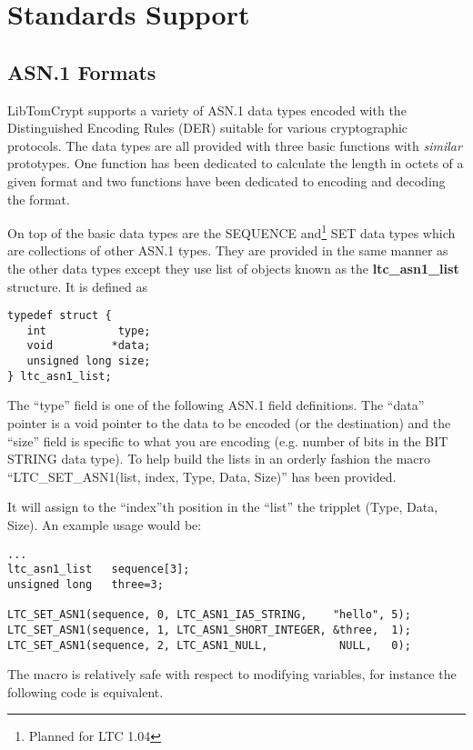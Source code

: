\documentclass[a4paper]{book}
\begin{document}
\chapter{Standards Support}
\section{ASN.1 Formats}
LibTomCrypt supports a variety of ASN.1 data types encoded with the Distinguished Encoding Rules (DER) suitable for various cryptographic protocols.  The data types
are all provided with three basic functions with \textit{similar} prototypes.  One function has been dedicated to calculate the length in octets of a given
format and two functions have been dedicated to encoding and decoding the format.  

On top of the basic data types are the SEQUENCE and\footnote{Planned for LTC 1.04} SET data types which are collections of other ASN.1 types.  They are provided 
in the same manner as the other data types except they use list of objects known as the \textbf{ltc\_asn1\_list} structure.  It is defined as 

\begin{verbatim}
typedef struct {
   int           type;
   void         *data;
   unsigned long size;
} ltc_asn1_list;
\end{verbatim}

The ``type'' field is one of the following ASN.1 field definitions.  The ``data'' pointer is a void pointer to the data to be encoded (or the destination) and the 
``size'' field is specific to what you are encoding (e.g. number of bits in the BIT STRING data type).  To help build the lists in an orderly fashion the macro
``LTC\_SET\_ASN1(list, index, Type, Data, Size)'' has been provided.

It will assign to the ``index''th position in the ``list'' the tripplet (Type, Data, Size).  An example usage would be:

\begin{small}
\begin{verbatim}
...
ltc_asn1_list   sequence[3];
unsigned long   three=3;

LTC_SET_ASN1(sequence, 0, LTC_ASN1_IA5_STRING,    "hello", 5);
LTC_SET_ASN1(sequence, 1, LTC_ASN1_SHORT_INTEGER, &three,  1);
LTC_SET_ASN1(sequence, 2, LTC_ASN1_NULL,           NULL,   0);
\end{verbatim}
\end{small}

The macro is relatively safe with respect to modifying variables, for instance the following code is equivalent.
\end{document}
